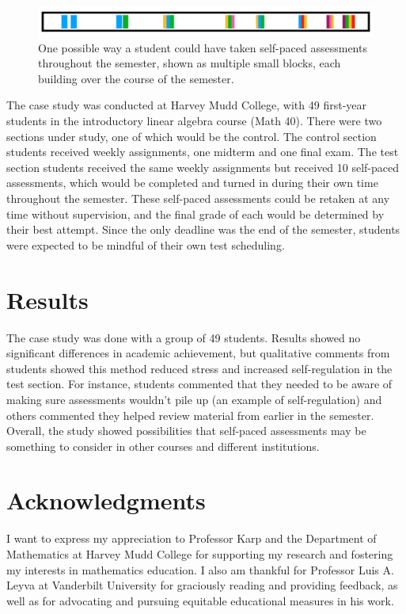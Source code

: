 \documentclass[thesis]{hmcposter}
\begin{document}
\begin{poster}
\begin{figure}
\begin{center}
\includegraphics[width=12in]{spa}
\caption{One possible way a student could have taken self-paced assessments throughout the semester, shown as multiple small blocks, each building over the course of the semester.}%
\end{center}
\end{figure}

The case study was conducted at Harvey Mudd College, with 49 first-year students in the introductory linear algebra course (Math 40). There were two sections under study, one of which would be the control. The control section students received weekly assignments, one midterm and one final exam. The test section students received the same weekly assignments but received 10 self-paced assessments, which would be completed and turned in during their own time throughout the semester. These self-paced assessments could be retaken at any time without supervision, and the final grade of each would be determined by their best attempt. Since the only deadline was the end of the semester, students were expected to be mindful of their own test scheduling.

\section{Results}%
The case study was done with a group of 49 students. Results showed no significant differences in academic achievement, but qualitative comments from students showed this method reduced stress and increased self-regulation in the test section. For instance, students commented that they needed to be aware of making sure assessments wouldn't pile up (an example of self-regulation) and others commented they helped review material from earlier in the semester. Overall, the study showed possibilities that self-paced assessments may be something to consider in other courses and different institutions.




\vfill

\section{Acknowledgments}
I want to express my appreciation to Professor Karp and the Department of Mathematics at Harvey Mudd College for supporting my research and fostering my interests in mathematics education. I also am thankful for Professor Luis A. Leyva at Vanderbilt University for graciously reading and providing feedback, as well as for advocating and pursuing equitable educational measures in his work.

\vfill
\end{poster}
\end{document}

